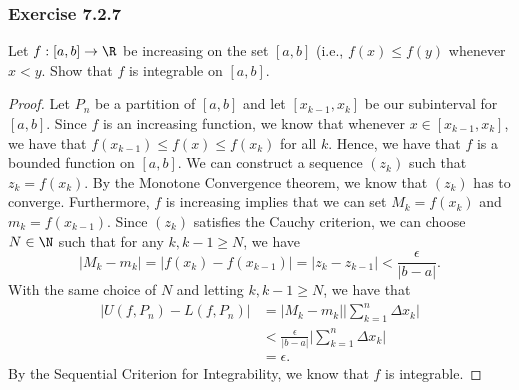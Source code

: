\subsubsection{Exercise 7.2.7}  Let \( f: [a,b] \to \R   \) be increasing on the set \( [a,b]  \) (i.e., \( f(x) \leq f(y) \) whenever \( x < y  \). Show that \( f  \) is integrable on \( [a,b]  \).
\begin{proof}
	Let \( P_{n} \) be a partition of \( [a,b]  \) and let \( [x_{k-1}, x_{k }] \) be our subinterval for \( [a,b]  \). Since \( f  \) is an increasing function, we know that whenever \( x \in [ x_{k-1}, x_{ k }] \), we have that \( f(x_{k-1}) \leq f(x) \leq f(x_{k})  \) for all \( k  \). Hence, we have that \( f  \) is a bounded function on \( [a,b]  \). We can construct a sequence \( (z_{k }) \) such that \( z_{k } = f(x_{k }) \). By the Monotone Convergence theorem, we know that \( (z_{k }) \) has to converge. Furthermore, \( f  \) is increasing implies that we can set \( M_{k } = f(x_{k})     \) and \( m_{k } = f(x_{k-1}) \). Since \( (z_{k}) \) satisfies the Cauchy criterion, we can choose \( N \in \N  \) such that for any \( k, k -1 \geq N  \), we have    
	\[  | M_{k} - m_{k } | = | f(x_{k}) - f(x_{k-1}) | = | z_{k } - z_{k-1}  | < \frac{ \epsilon  }{ |b - a|  }.  \] With the same choice of \( N  \) and letting \( k, k-1 \geq N  \), we have that 
	\begin{align*}
	    | U(f, P_{n}) - L(f, P_{n}) | &= | M_{k} - m_{k}  | \Big| \sum_{ k=1 }^{ n } \Delta x_{k}  \Big|  \\
									  &< \frac{ \epsilon  }{ |b -a|  } \Big| \sum_{ k=1 }^{ n } \Delta x_{k} \Big| \\
									  &= \epsilon.
	\end{align*}
	By the Sequential Criterion for Integrability, we know that \( f  \) is integrable.
\end{proof}





